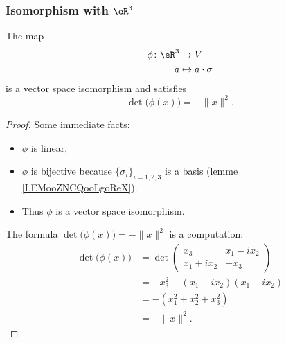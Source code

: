 \subsubsection{Isomorphism with \( \eR^3\)}

\begin{lemma}       \label{LEMooRFBTooIRDbEq}
    The map
    \begin{equation}
        \begin{aligned}
            \phi\colon \eR^3&\to V \\
            a&\mapsto a\cdot \sigma 
        \end{aligned}
    \end{equation}
    is a vector space isomorphism and satisfies
    \begin{equation}
        \det\big( \phi(x) \big)=-\| x \|^2.
    \end{equation}
\end{lemma}
 
\begin{proof}
    Some immediate facts:
    \begin{itemize}
        \item \( \phi\) is linear,
        \item \( \phi\) is bijective because \( \{ \sigma_i \}_{i=1,2,3}\) is a basis (lemme \ref{LEMooZNCQooLgoReX}).
        \item Thus \( \phi\) is a vector space isomorphism.
    \end{itemize}
    The formula \( \det\big( \phi(x) \big)=-\| x \|^2\) is a computation:
    \begin{subequations}
        \begin{align}
        \det\big( \phi(x) \big)&=\det\begin{pmatrix}
            x_3    &   x_1-ix_2    \\ 
            x_1+ix_2    &   -x_3
        \end{pmatrix}\\
        &=-x_3^2-(x_1-ix_2)(x_1+ix_2)\\
        &=-(x_1^2+x_2^2+x_3^2)\\
        &=-\| x \|^2.
        \end{align}
    \end{subequations}
\end{proof}

